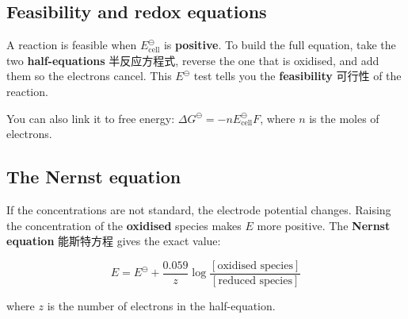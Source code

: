 \documentclass[11pt]{article}
\begin{document}
\subsection*{Feasibility and redox equations}

A reaction is feasible when $E^{\ominus}_{\text{cell}}$ is \textbf{positive}. To build the full equation, take the two \textbf{half-equations} 半反应方程式, reverse the one that is oxidised, and add them so the electrons cancel. This $E^{\ominus}$ test tells you the \textbf{feasibility} 可行性 of the reaction.

You can also link it to free energy: $\Delta G^{\ominus} = -n E^{\ominus}_{\text{cell}} F$, where $n$ is the moles of electrons.

\subsection*{The Nernst equation}

If the concentrations are not standard, the electrode potential changes. Raising the concentration of the \textbf{oxidised} species makes $E$ more positive. The \textbf{Nernst equation} 能斯特方程 gives the exact value:

\[
E = E^{\ominus} + \frac{0.059}{z} \log \frac{[\text{oxidised species}]}{[\text{reduced species}]}
\]

where $z$ is the number of electrons in the half-equation.
\end{document}
